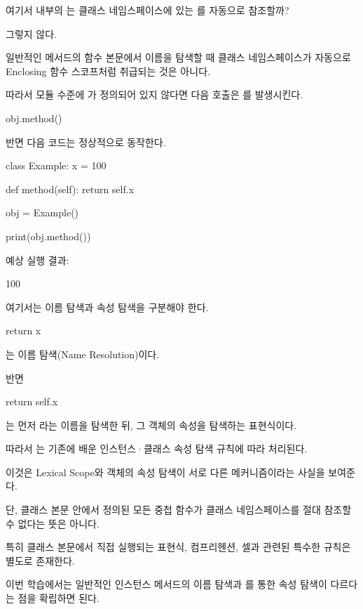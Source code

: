여기서  내부의 는 클래스 네임스페이스에 있는 를 자동으로 참조할까?

그렇지 않다.

일반적인 메서드의 함수 본문에서 이름을 탐색할 때 클래스 네임스페이스가 자동으로 Enclosing 함수 스코프처럼 취급되는 것은 아니다.

따라서 모듈 수준에 가 정의되어 있지 않다면 다음 호출은 를 발생시킨다.

\begin{dhkcode}
obj.method()
\end{dhkcode}

반면 다음 코드는 정상적으로 동작한다.

\begin{dhkcode}
class Example:
    x = 100

    def method(self):
        return self.x

obj = Example()

print(obj.method())
\end{dhkcode}

예상 실행 결과:

\begin{dhkzsh}
100
\end{dhkzsh}

여기서는 이름 탐색과 속성 탐색을 구분해야 한다.

\begin{dhkcode}
return x
\end{dhkcode}

는 이름 탐색(Name Resolution)이다.

반면

\begin{dhkcode}
return self.x
\end{dhkcode}

는 먼저 라는 이름을 탐색한 뒤, 그 객체의 속성을 탐색하는 표현식이다.

따라서 는 기존에 배운 인스턴스·클래스 속성 탐색 규칙에 따라 처리된다.

이것은 Lexical Scope와 객체의 속성 탐색이 서로 다른 메커니즘이라는 사실을 보여준다.

단, 클래스 본문 안에서 정의된 모든 중첩 함수가 클래스 네임스페이스를 절대 참조할 수 없다는 뜻은 아니다.

특히 클래스 본문에서 직접 실행되는 표현식, 컴프리헨션,  셀과 관련된 특수한 규칙은 별도로 존재한다.

이번 학습에서는 일반적인 인스턴스 메서드의 이름 탐색과 를 통한 속성 탐색이 다르다는 점을 확립하면 된다.

